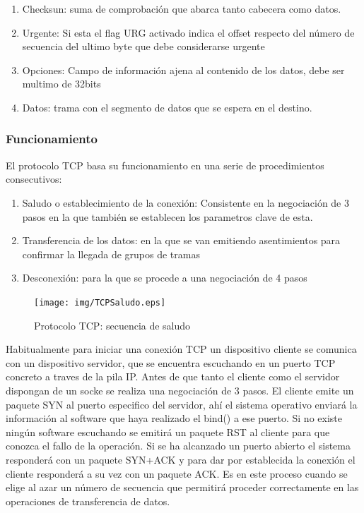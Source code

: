 \documentclass[a4paper,spanish,12pt]{book}
\begin{document}
\begin{enumerate}
	\item{Checksun: suma de comprobación que abarca tanto cabecera como datos.}
	\item{Urgente: Si esta el flag URG activado indica el offset respecto del número de secuencia del ultimo byte que debe considerarse urgente}
	\item{Opciones: Campo de información ajena al contenido de los datos, debe ser multimo de 32bits}
	\item{Datos: trama con el segmento de datos que se espera en el destino.}
\end{enumerate}

\subsubsection{Funcionamiento}
El protocolo TCP basa su funcionamiento en una serie de procedimientos consecutivos:
\begin{enumerate}
	\item{Saludo o establecimiento de la conexión: Consistente en la negociación de 3 pasos en la que tambi\'en se establecen los parametros clave de esta.}
	\item{Transferencia de los datos: en la que se van emitiendo asentimientos para confirmar la llegada de grupos de tramas}
	\item{Desconexión: para la que se procede a una negociación de 4 pasos}
\end{enumerate}

\begin{figure}
	\texttt{[image: img/TCPSaludo.eps]}	
              \caption{Protocolo TCP: secuencia de saludo}
  \label{fig:TCPSaludo}
\end{figure}

Habitualmente para iniciar una conexión TCP un dispositivo cliente se comunica con un dispositivo servidor, que se encuentra escuchando en un puerto TCP concreto a traves de la pila IP. Antes de que tanto el cliente como el servidor dispongan de un socke se realiza una negociación de 3 pasos. El cliente emite un paquete SYN al puerto especifico del servidor, ahí el sistema operativo enviará la información al software que haya realizado el bind() a ese puerto. Si no existe ningún software escuchando se emitirá un paquete RST al cliente para que conozca el fallo de la operación. Si se ha alcanzado un puerto abierto el sistema responderá con un paquete SYN+ACK y para dar por establecida la conexión el cliente responderá a su vez con un paquete ACK. Es en este proceso cuando se elige al azar un número de secuencia que permitirá proceder correctamente en las operaciones de transferencia de datos.
\end{document}
